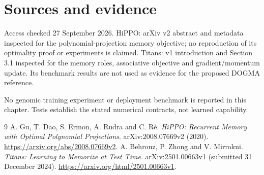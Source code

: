 \clearpage
\section*{Sources and evidence}
Access checked 27 September 2026. HiPPO: arXiv v2 abstract and metadata inspected
for the polynomial-projection memory objective; no reproduction of its
optimality proof or experiments is claimed. Titans: v1 introduction and
Section 3.1 inspected for the memory roles, associative objective and
gradient/momentum update. Its benchmark results are not used as evidence
for the proposed DOGMA reference.

No genomic training experiment or deployment benchmark is reported in this
chapter. Tests establish the stated numerical contracts, not learned capability.

\begingroup\let\chapter\section
\begin{thebibliography}{9}
 A. Gu, T. Dao, S. Ermon, A. Rudra and C. R\'e.
\emph{HiPPO: Recurrent Memory with Optimal Polynomial Projections}.
arXiv:2008.07669v2 (2020).
\url{https://arxiv.org/abs/2008.07669v2}.
 A. Behrouz, P. Zhong and V. Mirrokni.
\emph{Titans: Learning to Memorize at Test Time}.
arXiv:2501.00663v1 (submitted 31 December 2024).
\url{https://arxiv.org/html/2501.00663v1}.
\end{thebibliography}\endgroup
